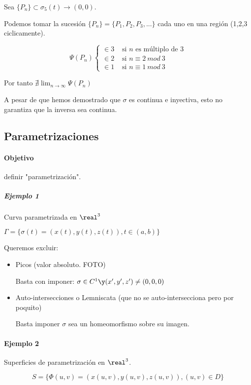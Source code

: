 Sea $\{P_n\}\subset \sigma_5(t) \rightarrow (0,0)$.

Podemos tomar la sucesión $\{P_n\} = \{P_1,P_2,P_3,...\}$ cada uno en una región (1,2,3 ciclicamente).

\[\Psi(P_n) \begin{cases}
\in 3 & \text{ si }n \text{ es múltiplo de }3\\
\in 2 & \text{ si } n\equiv 2\ mod \ 3\\
\in 1 & \text{ si } n \equiv 1\ mod \ 3
\end{cases}\]

Por tanto $\nexists \displaystyle \lim_{n\rightarrow \infty} \Psi(P_n)$

\begin{remark} A pesar de que hemos demostrado que $\sigma$ es continua e inyectiva, esto no garantiza que la inversa sea continua.\end{remark}

\subsection{Parametrizaciones}

\paragraph{Objetivo} definir "parametrización".

\subparagraph{Ejemplo 1} Curva parametrizada en $\real^3$

$\Gamma = \{\sigma(t) = (x(t),y(t),z(t)), t \in (a,b)\}$

Queremos excluir:
\begin{itemize}
\item Picos (valor absoluto. FOTO) 

Basta con imponer: $\sigma \in C^1 \y (x',y',z') \neq (0,0,0)$

\item Auto-intersecciones o Lemniscata (que no se auto-intersecciona pero por poquito) 

Basta imponer $\sigma$ sea un homeomorfismo sobre su imagen.

\end{itemize}

\paragraph{Ejemplo 2} Superficies de parametrización en $\real^3$.

\[S = \{\Phi(u,v) = (x(u,v),y(u,v),z(u,v)), (u,v)\in D\}\]

